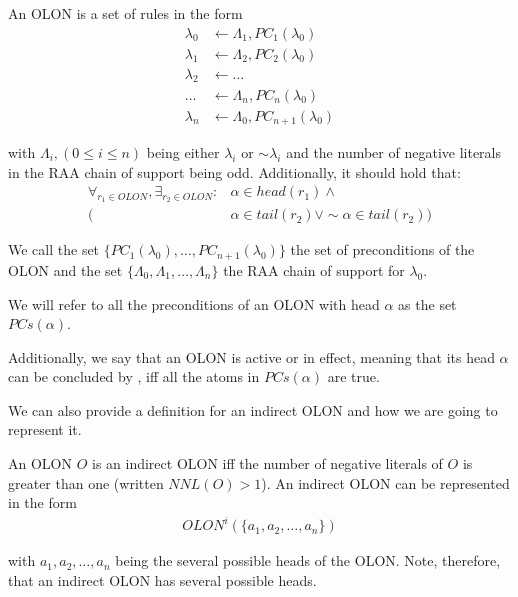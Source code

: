 \begin{definition}
\label{def:olon}
An OLON is a set of rules in the form
\begin{align*}
 \lambda_{0} &\leftarrow \Lambda_{1}, PC_{1}\left(\lambda_{0}\right)\\
 \lambda_{1} &\leftarrow \Lambda_{2}, PC_{2}\left(\lambda_{0}\right)\\
 \lambda_{2} &\leftarrow \ldots\\
 \ldots &\leftarrow \Lambda_{n}, PC_{n}\left(\lambda_{0}\right)\\
 \lambda_{n} &\leftarrow \Lambda_{0}, PC_{n+1}\left(\lambda_{0}\right)
\end{align*}

with $\Lambda_{i},\left(0\leq i\leq n\right)$ being either $\lambda_{i}$ or $\sim\lambda_{i}$ and the number of negative literals in the RAA chain of support being odd. Additionally, it should hold that:
\begin{align*}
		\forall_{r_{1}\in OLON},\exists_{r_{2}\in OLON}: & \alpha \in head\left(r_{1}\right) \wedge\\
										( &\alpha\in tail\left(r_{2}\right) \vee \sim\alpha\in tail(r_{2}))
\end{align*}

We call the set $\{PC_{1}\left(\lambda_{0}\right),\ldots,PC_{n+1}\left(\lambda_{0}\right)\}$ the set of preconditions of the OLON and the set $\{\Lambda_{0}, \Lambda_{1},\ldots,\Lambda_{n}\}$ the RAA chain of support for $\lambda_{0}$.

We will refer to all the preconditions of an OLON with head $\alpha$ as the set $PCs(\alpha)$.

Additionally, we say that an OLON is active or in effect, meaning that its head $\alpha$ can be concluded by \raa, iff all the atoms in $PCs(\alpha)$ are true.
\end{definition}

We can also provide a definition for an indirect OLON and how we are going to represent it.

\begin{definition}
An OLON $O$ is an indirect OLON iff the number of negative literals of $O$ is greater than one (written $NNL(O) > 1$). An indirect OLON can be represented in the form
\begin{align*}
OLON^{i}\left(\{a_{1},a_{2},\ldots,a_{n} \}\right)
\end{align*}

with $a_{1},a_{2},\ldots,a_{n} $ being the several possible heads of the OLON. Note, therefore, that an indirect OLON has several possible heads.
\end{definition}

